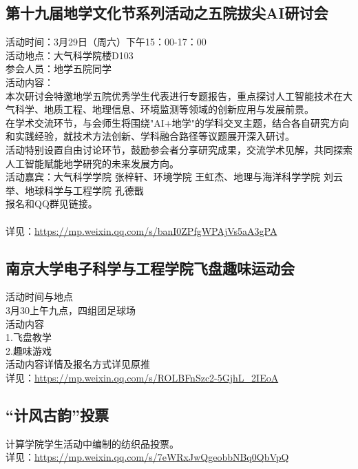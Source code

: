 \documentclass[letterpaper, 12pt]{article}
\begin{document}
\begin{multicols}{2}
\subsection{第十九届地学文化节系列活动之五院拔尖AI研讨会}
活动时间：3月29日（周六）下午15：00-17：00
\\活动地点：大气科学院楼D103
\\参会人员：地学五院同学
\\活动内容：
\\本次研讨会特邀地学五院优秀学生代表进行专题报告，重点探讨人工智能技术在大气科学、地质工程、地理信息、环境监测等领域的创新应用与发展前景。
\\在学术交流环节，与会师生将围绕"AI+地学"的学科交叉主题，结合各自研究方向和实践经验，就技术方法创新、学科融合路径等议题展开深入研讨。
\\活动特别设置自由讨论环节，鼓励参会者分享研究成果，交流学术见解，共同探索人工智能赋能地学研究的未来发展方向。
\\活动嘉宾：大气科学学院 张梓轩、环境学院 王虹杰、地理与海洋科学学院 刘云举、地球科学与工程学院 孔德戬
\\报名和QQ群见链接。
\\
\\详见：\url{https://mp.weixin.qq.com/s/banI0ZPfgWPAjVs5aA3gPA}

\subsection{南京大学电子科学与工程学院飞盘趣味运动会}
活动时间与地点
\\3月30上午九点，四组团足球场
\\活动内容
\\1.飞盘教学
\\2.趣味游戏
\\活动内容详情及报名方式详见原推
\\详见：\url{https://mp.weixin.qq.com/s/ROLBFnSzc2-5GjhL_2IEoA}

\subsection{“计风古韵”投票}
计算学院学生活动中编制的纺织品投票。
\\详见：\url{https://mp.weixin.qq.com/s/7eWRxJwQgeobbNBq0QbVpQ}


\end{multicols}
\end{document}
